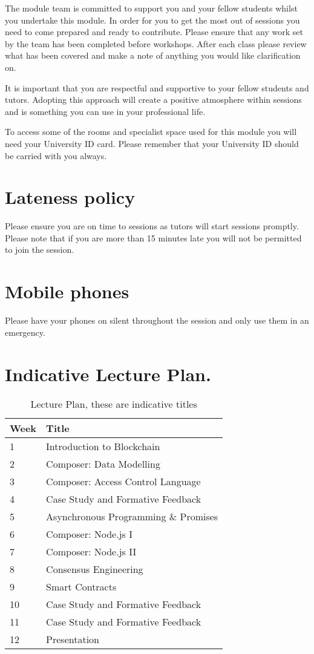 \documentclass{MDXHandbook}
\begin{document}
{The module team is committed to support you and your fellow students whilst you undertake this module. In order for you to get the most out of sessions you need to come prepared and ready to contribute. Please ensure that any work set by the team has been completed before workshops. After each class please review what has been covered and make a note of anything you would like clarification on. 

It is important that you are respectful and supportive to your fellow students and tutors. Adopting this approach will create a positive atmosphere within sessions and is something you can use in your professional life. 

To access some of the rooms and specialist space used for this module you will need your University ID card. Please remember that your University ID should be carried with you always.

\section*{Lateness policy}

Please ensure you are on time to sessions as tutors will start sessions promptly.  Please note that if you are more than 15 minutes late you will not be permitted to join the session. 

\section*{Mobile phones}

 Please have your phones on silent throughout the session and only use them in an emergency.



\section{Indicative Lecture Plan.}
\begin{table}[tbh!]
\begin{tabular}{ l l}
Week & Title \\ \hline
 1 & Introduction to Blockchain\\
 2 & Composer: Data Modelling\\
 3 & Composer: Access Control Language\\
 4 & Case Study and Formative Feedback\\
 5 & Asynchronous Programming \& Promises \\ 
 6 & Composer: Node.js I \\  
 7 & Composer: Node.js II\\ 
 8 & Consensus Engineering\\
 9 & Smart Contracts\\
 10 & Case Study and Formative Feedback\\
 11 & Case Study and Formative Feedback\\
 12 &  Presentation\\
 \end{tabular}
	\caption{Lecture Plan, these are indicative titles }\label{ta:lp}
\end{table}

}
\end{document}
